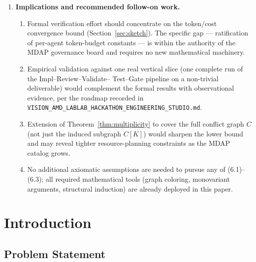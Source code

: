 \documentclass[12pt]{article}
\theoremstyle{definition}
\newcommand{\code}[1]{\texttt{#1}}
\newcommand{\VisionHackathon}{\code{VISION\_AMD\_\allowbreak LABLAB\_\allowbreak HACKATHON\_\allowbreak ENGINEERING\_STUDIO.md}}
\begin{document}
\begin{enumerate}
    \item \textbf{Implications and recommended follow-on work.}
    \begin{enumerate}
        \item[(6.1)] Formal verification effort should concentrate on
              the token/cost convergence bound
              (Section~\ref{sec:sketch}).
              The specific gap --- ratification of per-agent
              token-budget constants --- is within the authority of
              the MDAP governance board and requires no new
              mathematical machinery.
        \item[(6.2)] Empirical validation against one real vertical
              slice (one complete run of the Impl--Review--Validate--
              Test--Gate pipeline on a non-trivial deliverable) would
              complement the formal results with observational
              evidence, per the roadmap recorded in \VisionHackathon{}.
        \item[(6.3)] Extension of Theorem~\ref{thm:multiplicity} to
              cover the full conflict graph $C$ (not just the induced
              subgraph $C[K]$) would sharpen the lower bound and may
              reveal tighter resource-planning constraints as the MDAP
              catalog grows.
        \item[(6.4)] No additional axiomatic assumptions are needed to
              pursue any of (6.1)--(6.3); all required mathematical
              tools (graph coloring, monovariant arguments, structural
              induction) are already deployed in this paper.
    \end{enumerate}

\end{enumerate}

\newpage
\tableofcontents
\newpage

\section{Introduction}
\label{sec:intro}

\subsection{Problem Statement}
\label{sec:intro:problem}
\end{document}
